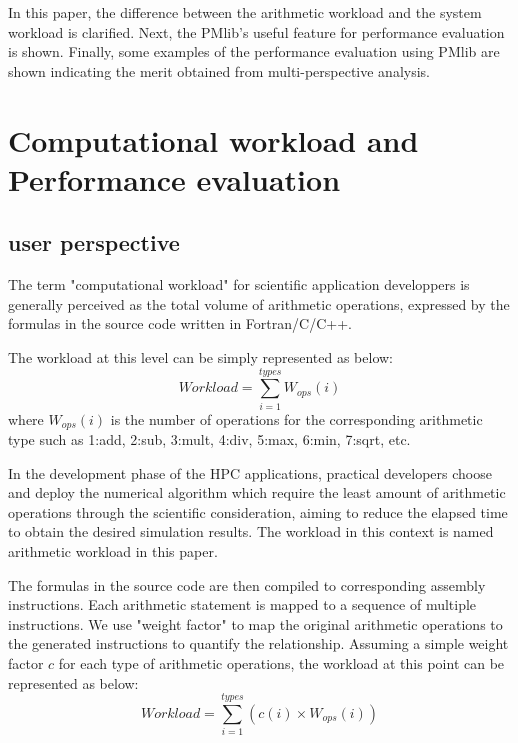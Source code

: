 \documentclass[conference]{IEEEtran}
\begin{document}
In this paper, the difference between the arithmetic workload and the system
workload is clarified.
Next, the PMlib's useful feature for performance evaluation is shown.
Finally, some examples of the performance evaluation using PMlib
are shown indicating the merit obtained from multi-perspective analysis.

\section{Computational workload and Performance evaluation}
\label{workload-evaluation}

\subsection{user perspective}
\label{subsection:user-perspective}

The term "computational workload" for scientific application developpers
is generally perceived as the total volume of arithmetic operations,
expressed by the formulas in the source code written in Fortran/C/C++.

The workload at this level can be simply represented as below:
\begin{equation}\label{eq:arithmetic-workload}
	Workload = \sum_{i=1}^{types} W_{ops}(i)
\end{equation}
where $ W_{ops}(i) $ is the number of operations for the
corresponding arithmetic type such as
1:add, 2:sub, 3:mult, 4:div, 5:max, 6:min, 7:sqrt, etc.

In the development phase of the HPC applications, practical developers
choose and deploy the numerical algorithm which require the least
amount of arithmetic operations through the scientific consideration,
aiming to reduce the elapsed time to obtain the desired simulation results.
The workload in this context is named arithmetic workload in this paper.

The formulas in the source code are then compiled to corresponding assembly
instructions.
Each arithmetic statement is mapped to a sequence of multiple instructions.
We use "weight factor" to map the original arithmetic operations to the
generated instructions to quantify the relationship.
Assuming a simple weight factor $ c $ for each type of
arithmetic operations, 
the workload at this point can be represented as below:
\begin{equation}\label{eq:application-workload}
		Workload = \sum_{i=1}^{types} \left(c(i)\times W_{ops}(i)\right)
\end{equation}
\end{document}
